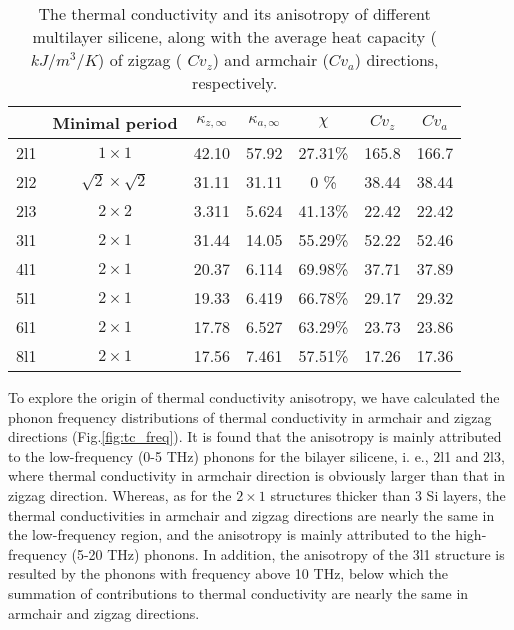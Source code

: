 \documentclass[aps,prb,twocolumn,showpacs,amsmath,amssymb]{revtex4-1}
\begin{document}
\begin{table*}
  \caption{\label{tab:table1}
    The thermal conductivity and its anisotropy of different multilayer silicene, along with the average heat capacity ($kJ/m^3/K$) of zigzag ( $Cv_z$) and armchair ($Cv_a$) directions, respectively. }
  \begin{ruledtabular}
    \begin{tabular}{ccccccc}
          & Minimal period
          & $\kappa_{z,\infty}$
          & $\kappa_{a,\infty}$
          & $\chi$
          & $Cv_{z}$
          & $Cv_{a}$                                                           \\
      \hline
      2l1 & $1 \times 1$             & 42.10 & 57.92 & 27.31\% & 165.8 & 166.7 \\
      2l2 & $\sqrt{2}\times\sqrt{2}$ & 31.11 & 31.11 & 0    \% & 38.44 & 38.44 \\
      2l3 & $2 \times 2$             & 3.311 & 5.624 & 41.13\% & 22.42 & 22.42 \\
      3l1 & $2 \times 1$             & 31.44 & 14.05 & 55.29\% & 52.22 & 52.46 \\
      4l1 & $2 \times 1$             & 20.37 & 6.114 & 69.98\% & 37.71 & 37.89 \\
      5l1 & $2 \times 1$             & 19.33 & 6.419 & 66.78\% & 29.17 & 29.32 \\
      6l1 & $2 \times 1$             & 17.78 & 6.527 & 63.29\% & 23.73 & 23.86 \\
      8l1 & $2 \times 1$             & 17.56 & 7.461 & 57.51\% & 17.26 & 17.36 \\
    \end{tabular}
  \end{ruledtabular}
\end{table*}

To explore the origin of thermal conductivity anisotropy, we have calculated the phonon frequency distributions of thermal conductivity in armchair and zigzag directions  (Fig.\ref{fig:tc_freq}).
It is found that the anisotropy is mainly attributed to the low-frequency (0-5 THz) phonons for the bilayer silicene, i. e., 2l1 and 2l3, where thermal conductivity in armchair direction is obviously larger than that in zigzag direction.
Whereas, as for the $2\times1$ structures thicker than 3 Si layers, the thermal conductivities in armchair and zigzag directions are nearly the same in the low-frequency region, and the anisotropy is mainly attributed to the high-frequency (5-20 THz) phonons.
In addition, the anisotropy of the 3l1 structure is resulted by the phonons with frequency above 10 THz, below which the summation of contributions to thermal conductivity are nearly the same in armchair and zigzag directions.
\end{document}
